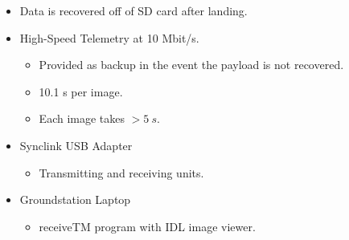 \documentclass[landscape,xcolor={table},10pt]{beamer}
\begin{document}
\begin{frame}
\begin{columns}[T]
\begin{column}{.49\textwidth}
			\begin{itemize}
				\item Data is recovered off of SD card after landing.
				\item High-Speed Telemetry at 10 Mbit/s.
				\begin{itemize}
					\item Provided as backup in the event the payload is not recovered.
			  		\item 10.1 s per image.
			  		\item Each image takes $> \SI{5}{s}$.
			  	\end{itemize}				
				\item Synclink USB Adapter
				\begin{itemize}
					\item Transmitting and receiving units.
				\end{itemize}
				\item Groundstation Laptop
				\begin{itemize}
					\item receiveTM program with IDL image viewer.
				\end{itemize}
		  	\end{itemize}
					
		\end{column}%
		\end{columns}

	\end{frame}
	
\end{document}
